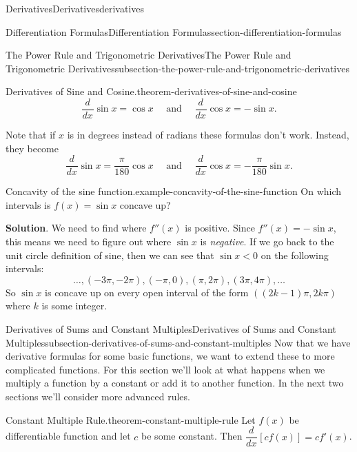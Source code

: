 \documentclass[oneside,10pt,]{book}
\numberwithin{equation}{section}
\newcommand{\dv}[3][]{\dfrac{d^{#1} #2}{d #3^{#1}}}
\begin{document}
\begin{chapterptx}{Derivatives}{}{Derivatives}{}{}{derivatives}
\begin{sectionptx}{Differentiation Formulas}{}{Differentiation Formulas}{}{}{section-differentiation-formulas}
\begin{subsectionptx}{The Power Rule and Trigonometric Derivatives}{}{The Power Rule and Trigonometric Derivatives}{}{}{subsection-the-power-rule-and-trigonometric-derivatives}
\begin{theorem}{Derivatives of Sine and Cosine.}{}{theorem-derivatives-of-sine-and-cosine}
\begin{equation*}
\dv{}{x}\sin x = \cos x\quad\text{ and }\quad\dv{}{x}\cos x = -\sin x.
\end{equation*}
%
\end{theorem}
\hypertarget{p-131}{}%
Note that if \(x\) is in degrees instead of radians these formulas don't work. Instead, they become%
\begin{equation*}
\dv{}{x}\sin x = \frac{\pi}{180}\cos x\quad\text{ and }\quad\dv{}{x}\cos x = -\frac{\pi}{180}\sin x.
\end{equation*}
%
\begin{example}{Concavity of the sine function.}{example-concavity-of-the-sine-function}%
\hypertarget{p-132}{}%
On which intervals is \(f(x) = \sin x\) concave up?%
\par\smallskip%
\noindent\textbf{Solution}.\hypertarget{solution-27}{}\quad%
\hypertarget{p-133}{}%
We need to find where \(f''(x)\) is positive. Since \(f''(x) = -\sin x\), this means we need to figure out where \(\sin x\) is \emph{negative}. If we go back to the unit circle definition of sine, then we can see that \(\sin x < 0\) on the following intervals:%
\begin{equation*}
\ldots, (-3\pi,-2\pi), (-\pi,0),(\pi,2\pi), (3\pi,4\pi),\ldots
\end{equation*}
So \(\sin x\) is concave up on every open interval of the form \(((2k-1)\pi, 2k\pi)\) where \(k\) is some integer.%
\end{example}
\end{subsectionptx}
%
%
\typeout{************************************************}
\typeout{************************************************}
%
\begin{subsectionptx}{Derivatives of Sums and Constant Multiples}{}{Derivatives of Sums and Constant Multiples}{}{}{subsection-derivatives-of-sums-and-constant-multiples}
\hypertarget{p-134}{}%
Now that we have derivative formulas for some basic functions, we want to extend these to more complicated functions. For this section we'll look at what happens when we multiply a function by a constant or add it to another function. In the next two sections we'll consider more advanced rules.%
\begin{theorem}{Constant Multiple Rule.}{}{theorem-constant-multiple-rule}%
\hypertarget{p-135}{}%
Let \(f(x)\) be differentiable function and let \(c\) be some constant. Then \(\dv{}{x}[cf(x)] = cf'(x)\).%
\end{theorem}

\end{subsectionptx}
\end{sectionptx}
\end{chapterptx}
\end{document}
